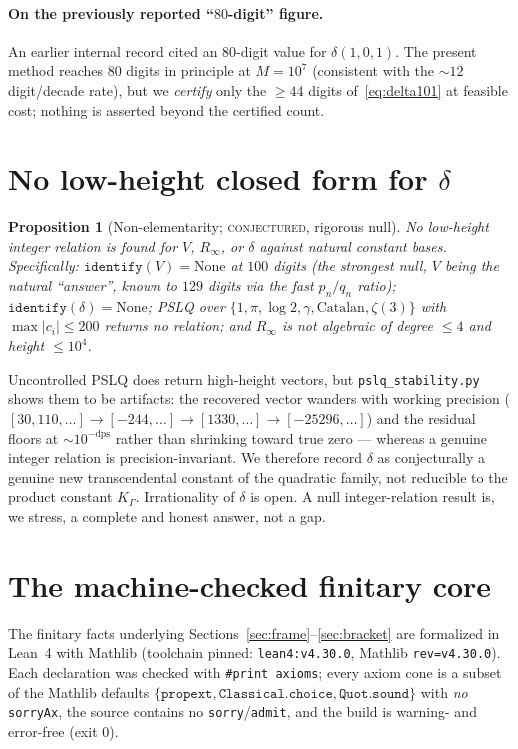 \documentclass[11pt]{article}
\newtheorem{proposition}{Proposition}
\newcommand{\Rinf}{R_\infty}
\begin{document}
\paragraph{On the previously reported ``$80$-digit'' figure.}
An earlier internal record cited an $80$-digit value for $\delta(1,0,1)$. The
present method reaches $80$ digits in principle at $M=10^7$ (consistent with the
$\sim12$ digit/decade rate), but we \emph{certify} only the $\ge44$ digits
of~\eqref{eq:delta101} at feasible cost; nothing is asserted beyond the certified
count.

\section{No low-height closed form for $\delta$}\label{sec:null}

\begin{proposition}[Non-elementarity; \textsc{conjectured}, rigorous null]
\label{prop:null}
No low-height integer relation is found for $V$, $\Rinf$, or $\delta$ against
natural constant bases. Specifically: $\texttt{identify}(V)=\text{None}$ at $100$
digits (the strongest null, $V$ being the natural ``answer'', known to $129$ digits
via the fast $p_n/q_n$ ratio); $\texttt{identify}(\delta)=\text{None}$; PSLQ over
$\{1,\pi,\log2,\gamma,\text{Catalan},\zeta(3)\}$ with $\max|c_i|\le200$ returns no
relation; and $\Rinf$ is not algebraic of degree $\le4$ and height $\le10^4$.
\end{proposition}

Uncontrolled PSLQ does return high-height vectors, but \texttt{pslq\_stability.py}
shows them to be artifacts: the recovered vector wanders with working precision
($[30,110,\dots]\to[-244,\dots]\to[1330,\dots]\to[-25296,\dots]$) and the residual
floors at $\sim10^{-\mathrm{dps}}$ rather than shrinking toward true zero --- whereas
a genuine integer relation is precision-invariant. We therefore record $\delta$ as
conjecturally a genuine new transcendental constant of the quadratic family, not
reducible to the product constant $K_\Gamma$. Irrationality of $\delta$ is open. A
null integer-relation result is, we stress, a complete and honest answer, not a gap.

\section{The machine-checked finitary core}\label{sec:lean}

The finitary facts underlying Sections~\ref{sec:frame}--\ref{sec:bracket} are
formalized in Lean~4 with Mathlib (toolchain pinned: \texttt{lean4:v4.30.0},
Mathlib \texttt{rev=v4.30.0}). Each declaration was checked with
\texttt{\#print axioms}; every axiom cone is a subset of the Mathlib defaults
$\{\texttt{propext},\texttt{Classical.choice},\texttt{Quot.sound}\}$ with \emph{no}
\texttt{sorryAx}, the source contains no \texttt{sorry}/\texttt{admit}, and the
build is warning- and error-free (exit $0$).
\end{document}
